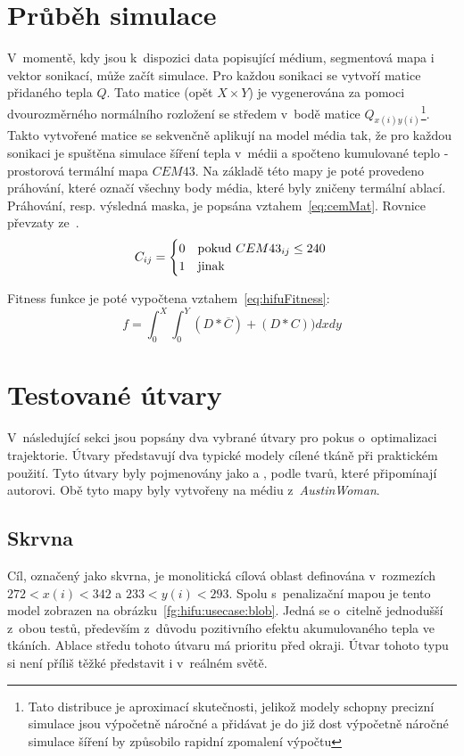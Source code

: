 \section{Průběh simulace}
V~momentě, kdy jsou k~dispozici data popisující médium, segmentová mapa i vektor sonikací, může začít simulace. Pro každou sonikaci se vytvoří matice přidaného tepla $Q$. Tato matice (opět $X \times Y$) je vygenerována za pomoci dvourozměrného normálního rozložení se středem v~bodě matice $Q_{x(i)y(i)}$\footnote{Tato distribuce je aproximací skutečnosti, jelikož modely schopny precizní simulace jsou výpočetně náročné a přidávat je do již dost výpočetně náročné simulace šíření by způsobilo rapidní zpomalení výpočtu}. Takto vytvořené matice se sekvenčně aplikují na model média tak, že pro každou sonikaci je spuštěna simulace šíření tepla v~médii a spočteno kumulované teplo - prostorová termální mapa $CEM{43}$. Na základě této mapy je poté provedeno práhování, které označí všechny body média, které byly zničeny termální ablací. Práhování, resp. výsledná maska, je popsána vztahem~\ref{eq:cemMat}. Rovnice převzaty ze~\cite{FITPUB11696}.
\begin{equation}
    C_{ij} = \begin{cases} 
            0       & \text{pokud } CEM43_{ij} \le 240\\
            1       & \text{jinak}
        \end{cases}\\
        \label{eq:cemMat}
\end{equation}{}

Fitness funkce je poté vypočtena vztahem~\ref{eq:hifuFitness}:
\begin{equation}
    f = \int_{0}^{X}\int_{0}^{Y}(D * \overline{C}) + (D * C)) dxdy
    \label{eq:hifuFitness}
\end{equation}

\section{Testované útvary}
V~následující sekci jsou popsány dva vybrané útvary pro pokus o~optimalizaci trajektorie. Útvary představují dva typické modely cílené tkáně při praktickém použití. Tyto útvary byly pojmenovány jako  a , podle tvarů, které připomínají autorovi. Obě tyto mapy byly vytvořeny na médiu z~\emph{AustinWoman}.

\subsection{Skrvna}
Cíl, označený jako skvrna, je monolitická cílová oblast definována v~rozmezích $272 < x(i) < 342$ a $233 < y(i) < 293$. Spolu s~penalizační mapou je tento model zobrazen na obrázku~\ref{fg:hifu:usecase:blob}. Jedná se o~citelně jednodušší z~obou testů, především z~důvodu pozitivního efektu akumulovaného tepla ve tkáních. Ablace středu tohoto útvaru má prioritu před okraji. Útvar tohoto typu si není příliš těžké představit i v~reálném světě. 

